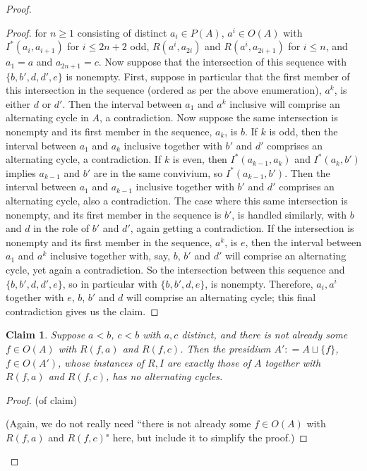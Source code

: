 \documentclass[10pt,a4paper]{amsart}
\newtheorem{claim}{Claim}
\begin{document}
\begin{proof}
\begin{proof}
for $n \geq 1$ consisting of distinct $a_i \in P(A)$, $a^i \in O(A)$ with $I^{*}(a_i, a_{i+1})$ for $i \leq 2n+2$ odd, $R(a^i, a_{2i})$ and $R(a^i, a_{2i+1})$ for $i \leq n$,  and $a_1 = a$ and $a_{2n+1} = c$. Now suppose that the intersection of this sequence with $\{b, b', d, d', e\}$ is nonempty. First, suppose in particular that the first member of this intersection in the sequence (ordered as per the above enumeration), $a^k$, is either $d$ or $d'$. Then the interval between $a_1$ and $a^k$ inclusive will comprise an alternating cycle in $A$, a contradiction. Now suppose the same intersection is nonempty and its first member in the sequence, $a_k$, is $b$. If $k$ is odd, then the interval between $a_1$ and $a_k$ inclusive together with $b'$ and $d'$ comprises an alternating cycle, a contradiction. If $k$ is even, then $I^{*}(a_{k-1}, a_{k})$ and $I^{*}(a_k, b')$ implies $a_{k-1}$ and $b'$ are in the same convivium, so $I^{*}(a_{k-1}, b')$. Then the interval between $a_{1}$ and $a_{k-1}$ inclusive together with $b'$ and $d'$ comprises an alternating cycle, also a contradiction. The case where this same intersection is nonempty, and its first member in the sequence is $b'$, is handled similarly, with $b$ and $d$ in the role of $b'$ and $d'$, again getting a contradiction. If the intersection is nonempty and its first member in the sequence, $a^{k}$, is $e$, then the interval between $a_1$ and $a^{k}$ inclusive together with, say, $b$, $b'$ and $d'$ will comprise an alternating cycle, yet again a contradiction. So the intersection between this sequence and $\{b, b', d, d', e\}$, so in particular with $\{b,b',  d, e\}$, is nonempty. Therefore,  $a_i, a^{i}$ together with $e$, $b$, $b'$ and $d$ will comprise an alternating cycle; this final contradiction gives us the claim.

    
\end{proof}


\begin{claim}
    \label{order construction 3} Suppose $a < b$, $c < b$ with $a, c$ distinct, and there is not already some $f\in O(A)$ with $R(f, a)$ and $R(f, c)$. Then the presidium $A' : = A \sqcup \{f\}$, $f \in O(A')$, whose instances of $R, I$ are exactly those of $A$ together with $R(f, a)$ and $R(f, c)$, has no alternating cycles.
\end{claim}

\begin{proof}
    (of claim)

    (Again, we do not really need ``there is not already some $f\in O(A)$ with $R(f, a)$ and $R(f, c)$" here, but include it to simplify the proof.) 


\end{proof}
\end{proof}
\end{document}
